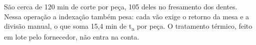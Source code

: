 São cerca de 120 min de corte por peça, 105 deles no fresamento dos dentes. Nessa operação a indexação também pesa: cada vão exige o retorno da mesa e a divisão manual, o que soma 15,4 min de t\textsubscript{a} por peça. O tratamento térmico, feito em lote pelo fornecedor, não entra na conta.
